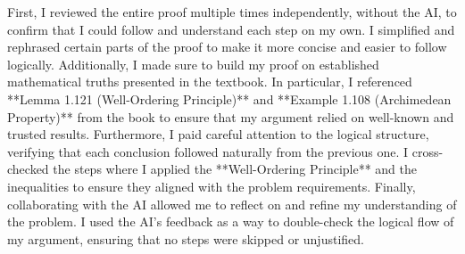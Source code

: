 \documentclass{article}
\begin{document}
First, I reviewed the entire proof multiple times independently, without the AI, to confirm that I could follow and understand each step on my own. I simplified and rephrased certain parts of the proof to make it more concise and easier to follow logically. Additionally, I made sure to build my proof on established mathematical truths presented in the textbook. In particular, I referenced **Lemma 1.121 (Well-Ordering Principle)** and **Example 1.108 (Archimedean Property)** from the book to ensure that my argument relied on well-known and trusted results. Furthermore, I paid careful attention to the logical structure, verifying that each conclusion followed naturally from the previous one. I cross-checked the steps where I applied the **Well-Ordering Principle** and the inequalities to ensure they aligned with the problem requirements. Finally, collaborating with the AI allowed me to reflect on and refine my understanding of the problem. I used the AI’s feedback as a way to double-check the logical flow of my argument, ensuring that no steps were skipped or unjustified.
\end{document}
